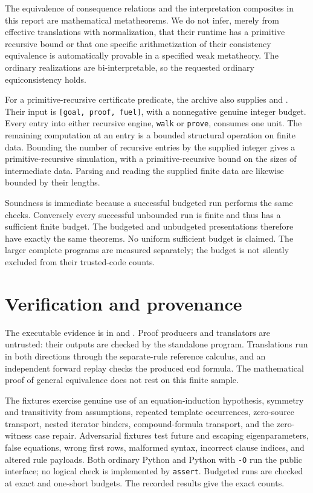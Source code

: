 The equivalence of consequence relations and the interpretation composites
in this report are mathematical metatheorems. We do not infer, merely from
effective translations with normalization, that their runtime has a primitive
recursive bound or that one specific arithmetization of their consistency
equivalence is automatically provable in a specified weak metatheory.
The ordinary realizations are bi-interpretable, so the requested ordinary
equiconsistency holds.

For a primitive-recursive certificate predicate, the archive also supplies
 and
. Their input is
\texttt{[goal, proof, fuel]}, with a nonnegative genuine integer budget.
Every entry into either recursive engine, \texttt{walk} or \texttt{prove},
consumes one unit. The remaining computation at an entry is a bounded
structural operation on finite data. Bounding the number of recursive entries
by the supplied integer gives a primitive-recursive simulation, with a
primitive-recursive bound on the sizes of intermediate data. Parsing and
reading the supplied finite data are likewise bounded by their lengths.

Soundness is immediate because a successful budgeted run performs the same
checks. Conversely every successful unbounded run is finite and thus has a
sufficient finite budget. The budgeted and unbudgeted presentations therefore
have exactly the same theorems. No uniform sufficient budget is claimed.
The larger complete programs are measured separately; the budget is not
silently excluded from their trusted-code counts.

\section{Verification and provenance}
\label{sec:verification}

The executable evidence is in  and .
Proof producers and translators are untrusted: their outputs are checked by
the standalone program. Translations run in both directions through the
separate-rule reference calculus, and an independent forward replay checks
the produced end formula. The mathematical proof of general equivalence does
not rest on this finite sample.

The fixtures exercise genuine use of an equation-induction hypothesis,
symmetry and transitivity from assumptions, repeated template occurrences,
zero-source transport, nested iterator binders, compound-formula transport,
and the zero-witness case repair. Adversarial fixtures test future and
escaping eigenparameters, false equations, wrong first rows, malformed
syntax, incorrect clause indices, and altered rule payloads. Both ordinary
Python and Python with \texttt{-O} run the public interface; no logical check
is implemented by \texttt{assert}. Budgeted runs are checked at exact and
one-short budgets. The recorded results give the exact counts.

